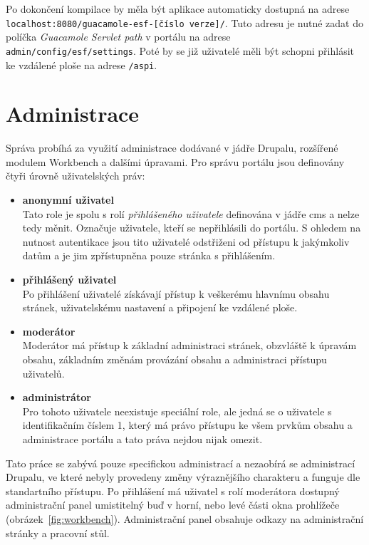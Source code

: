 Po dokončení kompilace by měla být aplikace automaticky dostupná na adrese \texttt{localhost:8080/guacamole-esf-[číslo verze]/}. Tuto adresu je nutné zadat do políčka \emph{Guacamole Servlet path} v portálu na adrese \\ \texttt{admin/config/esf/settings}. Poté by se již uživatelé měli být schopni přihlásit ke vzdálené ploše na adrese \texttt{/aspi}.

\section{Administrace}
\label{sec:administrace}
Správa probíhá za využití administrace dodávané v jádře Drupalu, rozšířené modulem Workbench a dalšími úpravami. Pro správu portálu jsou definovány čtyři úrovně uživatelských práv:

\begin{itemize}
  \item \textbf{anonymní uživatel} \hfill \\
    Tato role je spolu s rolí \emph{přihlášeného uživatele} definována v jádře \gls{cms} a nelze tedy měnit. Označuje uživatele, kteří se nepřihlásili do portálu. S ohledem na nutnost autentikace jsou tito uživatelé odstřiženi od přístupu k jakýmkoliv datům a je jim zpřístupněna pouze stránka s přihlášením.
  \item \textbf{přihlášený uživatel} \hfill \\
    Po přihlášení uživatelé získávají přístup k veškerému hlavnímu obsahu stránek, uživatelskému nastavení a připojení ke vzdálené ploše. 
  \item \textbf{moderátor} \hfill \\
    Moderátor má přístup k základní administraci stránek, obzvláště k úpravám obsahu, základním změnám provázání obsahu a administraci přístupu uživatelů.
  \item \textbf{administrátor} \hfill \\
    Pro tohoto uživatele neexistuje speciální role, ale jedná se o uživatele s identifikačním číslem 1, který má právo přístupu ke všem prvkům obsahu a administrace portálu a tato práva nejdou nijak omezit.
\end{itemize}

Tato práce se zabývá pouze specifickou administrací a nezaobírá se administrací Drupalu, ve které nebyly provedeny změny výraznějšího charakteru a funguje dle standartního přístupu. Po přihlášení má uživatel s rolí moderátora dostupný administrační panel umistitelný buď v horní, nebo levé části okna prohlížeče (obrázek~\ref{fig:workbench}). Administrační panel obsahuje odkazy na administrační stránky a pracovní stůl. 

